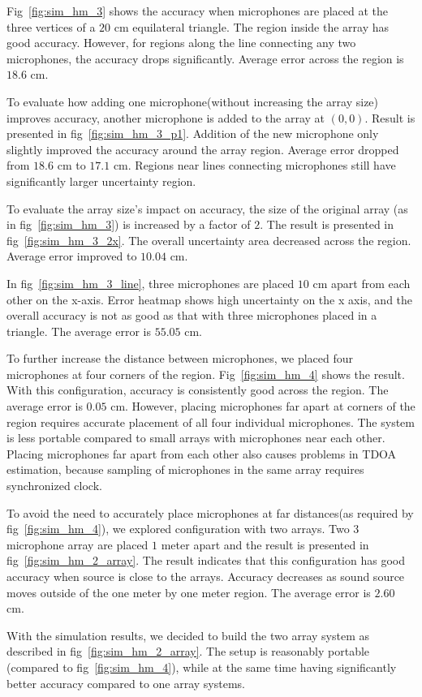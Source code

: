 Fig~\ref{fig:sim_hm_3} shows the accuracy when microphones are placed at the three vertices of a $20$ cm equilateral triangle. The region inside the array has good accuracy. However, for regions along the line connecting any two microphones, the accuracy drops significantly. Average error across the region is $18.6$ cm.

To evaluate how adding one microphone(without increasing the array size) improves accuracy, another microphone is added to the array at $(0,0)$. Result is presented in fig~\ref{fig:sim_hm_3_p1}. Addition of the new microphone only slightly improved the accuracy around the array region. Average error dropped from $18.6$ cm to $17.1$ cm. Regions near lines connecting microphones still have significantly larger uncertainty region.

To evaluate the array size's impact on accuracy, the size of the original array (as in fig~\ref{fig:sim_hm_3}) is increased by a factor of $2$. The result is presented in fig~\ref{fig:sim_hm_3_2x}. The overall uncertainty area decreased across the region. Average error improved to $10.04$ cm. 

In fig~\ref{fig:sim_hm_3_line}, three microphones are placed $10$ cm apart from each other on the x-axis. Error heatmap shows high uncertainty on the x axis, and the overall accuracy is not as good as that with three microphones placed in a triangle. The average error is $55.05$ cm. 

To further increase the distance between microphones, we placed four microphones at four corners of the region. Fig~\ref{fig:sim_hm_4} shows the result. With this configuration, accuracy is consistently good across the region. The average error is $0.05$ cm.  However, placing microphones far apart at corners of the region requires accurate placement of all four individual microphones. The system is less portable compared to small arrays with microphones near each other. Placing microphones far apart from each other also causes problems in TDOA estimation, because sampling of microphones in the same array requires synchronized clock.

To avoid the need to accurately place microphones at far distances(as required by fig~\ref{fig:sim_hm_4}), we explored configuration with two arrays. Two $3$ microphone array are placed $1$ meter apart and the result is presented in fig~\ref{fig:sim_hm_2_array}.  The result indicates that this configuration has good accuracy when source is close to the arrays. Accuracy decreases as sound source moves outside of the one meter by one meter region. The average error is $2.60$ cm. 

With the simulation results, we decided to build the two array system as described in fig~\ref{fig:sim_hm_2_array}. The setup is reasonably portable (compared to fig~\ref{fig:sim_hm_4}), while at the same time having significantly better accuracy compared to one array systems.
